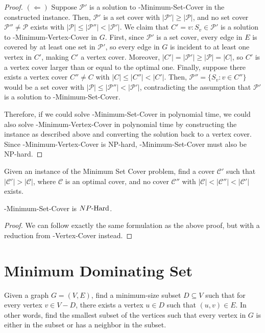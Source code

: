 \begin{proof}
$(\Leftarrow)$ Suppose $\mathcal{P}'$ is a solution to \inob{}-Minimum-Set-Cover in the constructed instance. Then, $\mathcal{P}'$ is a set cover with $|\mathcal{P}'| \geq |\mathcal{P}|$, and no set cover $\mathcal{P}'' \neq \mathcal{P}$ exists with $|\mathcal{P}| \leq |\mathcal{P}''| < |\mathcal{P}'|$. We claim that $C' = {v : S_v \in \mathcal{P}'}$ is a solution to \inob{}-Minimum-Vertex-Cover in $G$. First, since $\mathcal{P}'$ is a set cover, every edge in $E$ is covered by at least one set in $\mathcal{P}'$, so every edge in $G$ is incident to at least one vertex in $C'$, making $C'$ a vertex cover. Moreover, $|C'| = |\mathcal{P}'| \geq |\mathcal{P}| = |C|$, so $C'$ is a vertex cover larger than or equal to the optimal one. Finally, suppose there exists a vertex cover $C'' \neq C$ with $|C| \leq |C''| < |C'|$. Then, $\mathcal{P}'' = \{S_v : v \in C''\}$ would be a set cover with $|\mathcal{P}| \leq |\mathcal{P}''| < |\mathcal{P}'|$, contradicting the assumption that $\mathcal{P}'$ is a solution to \inob{}-Minimum-Set-Cover.

Therefore, if we could solve \inob{}-Minimum-Set-Cover in polynomial time, we could also solve \inob{}-Minimum-Vertex-Cover in polynomial time by constructing the instance as described above and converting the solution back to a vertex cover. Since \inob{}-Minimum-Vertex-Cover is NP-hard, \inob{}-Minimum-Set-Cover must also be NP-hard.
\end{proof}
\begin{definition}
Given an instance of the Minimum Set Cover problem, find a cover $\mathcal{C}'$ such that $|\mathcal{C}'| > |\mathcal{C}|$, where $\mathcal{C}$ is an optimal cover, and no cover $\mathcal{C}''$ with $|\mathcal{C}| < |\mathcal{C}''| < |\mathcal{C}'|$ exists.
\end{definition}

\begin{theorem}
    \exb{}-Minimum-Set-Cover is ${NP\text{-Hard{}}}$.
\end{theorem}
\begin{proof}
    We can follow exactly the same formulation as the above \inob{} proof, but with a reduction from \exb{}-Vertex-Cover instead.
\end{proof}

\section{Minimum Dominating Set}
\begin{definition}
Given a graph $G = (V, E)$, find a minimum-size subset $D \subseteq V$ such that for every vertex $v \in V - D$, there exists a vertex $u \in D$ such that $(u, v) \in E$. In other words, find the smallest subset of the vertices such that every vertex in $G$ is either in the subset or has a neighbor in the subset.
\end{definition}

